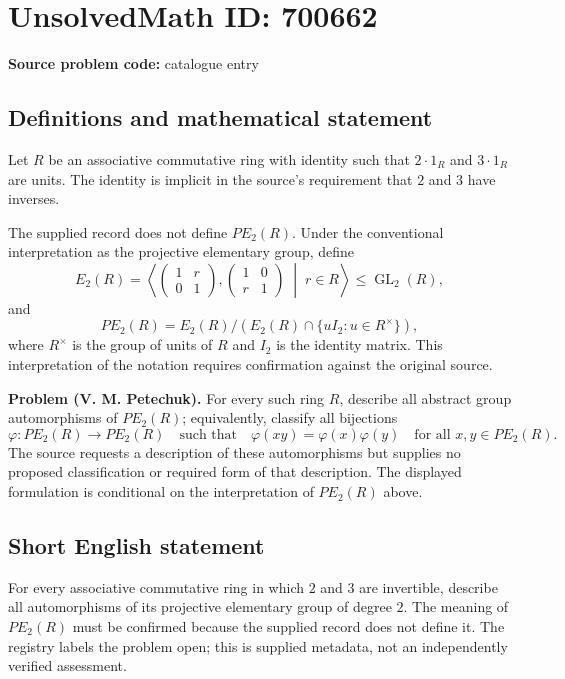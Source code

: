 \documentclass[11pt]{article}
\begin{document}
\section*{UnsolvedMath ID: 700662}
\textbf{Source problem code:} catalogue entry
\subsection{Definitions and mathematical statement}
Let \(R\) be an associative commutative ring with identity such that \(2\cdot 1_R\) and \(3\cdot 1_R\) are units. The identity is implicit in the source's requirement that \(2\) and \(3\) have inverses.

The supplied record does not define \(PE_2(R)\). Under the conventional interpretation as the projective elementary group, define
\[
E_2(R)=\left\langle
\begin{pmatrix}1&r\\0&1\end{pmatrix},
\begin{pmatrix}1&0\\r&1\end{pmatrix}
\;\middle|\;r\in R
\right\rangle\leq \operatorname{GL}_2(R),
\]
and
\[
PE_2(R)=E_2(R)\big/\left(E_2(R)\cap\{uI_2:u\in R^\times\}\right),
\]
where \(R^\times\) is the group of units of \(R\) and \(I_2\) is the identity matrix. This interpretation of the notation requires confirmation against the original source.

\textbf{Problem (V. M. Petechuk).} For every such ring \(R\), describe all abstract group automorphisms of \(PE_2(R)\); equivalently, classify all bijections
\[
\varphi:PE_2(R)\longrightarrow PE_2(R)
\quad\text{such that}\quad
\varphi(xy)=\varphi(x)\varphi(y)
\quad\text{for all }x,y\in PE_2(R).
\]
The source requests a description of these automorphisms but supplies no proposed classification or required form of that description. The displayed formulation is conditional on the interpretation of \(PE_2(R)\) above.
\subsection{Short English statement}
For every associative commutative ring in which \(2\) and \(3\) are invertible, describe all automorphisms of its projective elementary group of degree \(2\). The meaning of \(PE_2(R)\) must be confirmed because the supplied record does not define it. The registry labels the problem open; this is supplied metadata, not an independently verified assessment.
\end{document}
